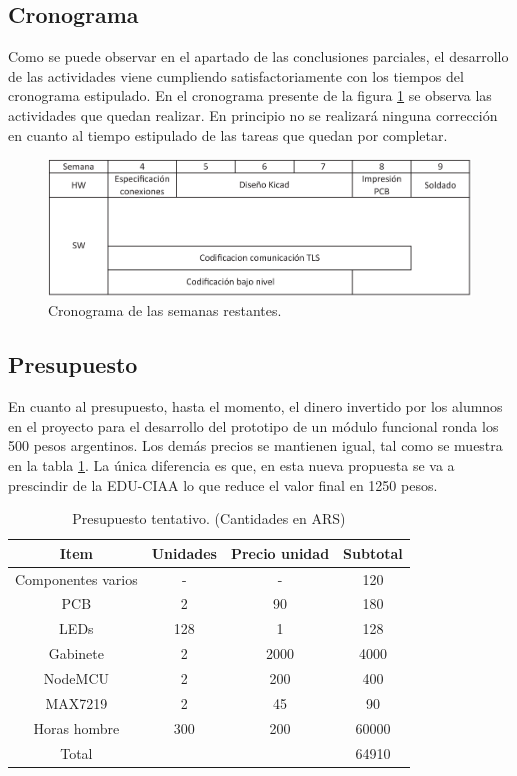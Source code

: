 \subsection{Cronograma}
Como se puede observar en el apartado de las conclusiones parciales, el desarrollo de las actividades viene cumpliendo satisfactoriamente con los tiempos del cronograma estipulado. En el cronograma presente de la figura \ref{fig:cronograma} se observa las actividades que quedan realizar. En principio no se realizará ninguna corrección en cuanto al tiempo estipulado de las tareas que quedan por completar.

\begin{figure}[h!]
    \centering
    \includegraphics[width=\linewidth]{imagenes/cronograma.pdf}
    \caption{Cronograma de las semanas restantes.}
    \label{fig:cronograma}
\end{figure}

\subsection{Presupuesto}
En cuanto al presupuesto, hasta el momento, el dinero invertido por los alumnos en el proyecto para el desarrollo del prototipo de un módulo funcional ronda los 500 pesos argentinos. Los demás precios se mantienen igual, tal como se muestra en la tabla \ref{tab:presupuesto}. La única diferencia es que, en esta nueva propuesta se va a prescindir de la EDU-CIAA lo que reduce el valor final en 1250 pesos.

\begin{table}[]
	\centering
	\caption{Presupuesto tentativo. (Cantidades en ARS)}
	\vspace{0.25cm}
	\label{tab:presupuesto}
	\begin{tabular}{cccc}
		Item				& Unidades		& Precio unidad		& Subtotal			\\
		\hline
		Componentes varios	& -				& -					& 120				\\
		PCB					& 2				& 90				& 180				\\
		LEDs				& 128			& 1					& 128				\\
		Gabinete			& 2				& 2000				& 4000				\\
		NodeMCU				& 2				& 200				& 400				\\
		MAX7219				& 2				& 45				& 90				\\
		Horas hombre		& 300			& 200				& 60000				\\
		\hline
		Total				&				&					& 64910				\\ 
		\hline
	\end{tabular}
\end{table}
